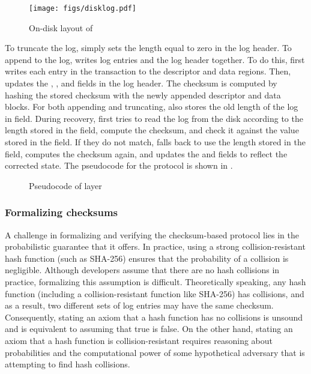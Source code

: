 \begin{figure}[htb]
    \centering
    \texttt{[image: figs/disklog.pdf]}
    \caption{On-disk layout of \syslog}
    \label{fig:loglayout}
\end{figure}

To truncate the log, \disklog simply sets the length equal to zero in the
log header.  To append to the log, \disklog writes log entries and the log
header together. To do this, \disklog first writes each entry in the
transaction to the descriptor and data regions. Then, \disklog updates the
, , and  fields in the log header.  The
checksum is computed by hashing the stored checksum with the newly appended
descriptor and data blocks.  For both appending and truncating, \disklog
also stores the old length of the log in  field. During
recovery, \disklog first tries to read the log from the disk according to the
length stored in the  field, compute the checksum, and check it against
the value stored in the  field. If they do not match, \disklog
falls back to use the length stored in the  field, computes
the checksum again, and updates the  and  fields to
reflect the corrected state. The pseudocode for the \disklog protocol is
shown in .

\begin{figure}[htb]
    \centering
    \figcodefont
    
    \caption{Pseudocode of \disklog layer}
    \label{fig:disklog}
\end{figure}


\subsubsection{Formalizing checksums}

A challenge in formalizing and verifying the checksum-based protocol lies
in the probabilistic guarantee that it offers.  In practice, using a strong
collision-resistant hash function (such as SHA-256) ensures that the
probability of a collision is negligible.  Although developers assume that
there are no hash collisions in practice, formalizing this assumption is
difficult.  Theoretically speaking, any hash function (including a
collision-resistant function like SHA-256) has collisions, and as a result,
two different sets of log entries may have the same checksum.
Consequently, stating an axiom that a hash function has no collisions is
unsound and is equivalent to assuming that true is false.  On the other
hand, stating an axiom that a hash function is collision-resistant requires
reasoning about probabilities and the computational power of some
hypothetical adversary that is attempting to find hash collisions.  


